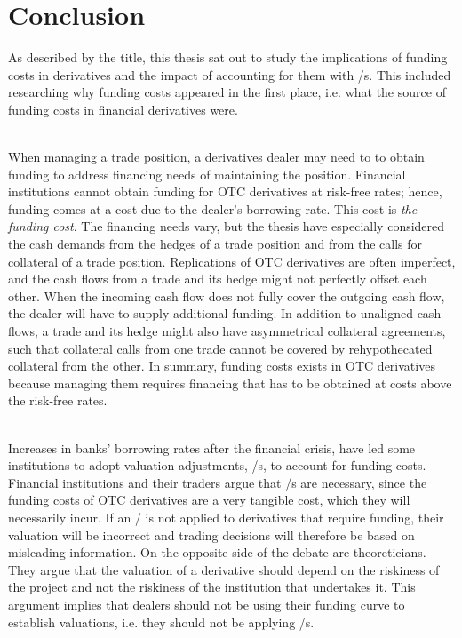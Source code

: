 \documentclass[main.tex]{subfiles}
\begin{document}
    \section{Conclusion}

    As described by the title, this thesis sat out to study the implications
    of funding costs in derivatives and the impact of accounting for them with \FVA/s.
    This included researching why funding costs appeared in the first place,
    i.e. what the source of funding costs in financial derivatives were.
    
    \textbf{\researchQuestionFundingCosts}\\
    When managing a trade position, a derivatives dealer may need to to obtain funding 
    to address financing needs of maintaining the position.
    Financial institutions cannot obtain funding for OTC derivatives at risk-free rates;
    hence, funding comes at a cost due to the dealer's borrowing rate.
    This cost is \textit{the funding cost}.
    The financing needs vary, but the thesis have especially considered
    the cash demands from the hedges of a trade position
    and from the calls for collateral of a trade position.
    Replications of OTC derivatives are often imperfect,
    and the cash flows from a trade and its hedge might not perfectly offset each other.
    When the incoming cash flow does not fully cover the outgoing cash flow,
    the dealer will have to supply additional funding.
    In addition to unaligned cash flows, 
    a trade and its hedge might also have asymmetrical collateral agreements,
    such that collateral calls from one trade cannot be covered by rehypothecated collateral from the other.
    In summary, funding costs exists in OTC derivatives
    because managing them requires financing 
    that has to be obtained at costs above the risk-free rates.

    \textbf{\researchQuestionFvaDebate}\\
    Increases in banks' borrowing rates after the financial crisis,
    have led some institutions to adopt valuation adjustments, \FVA/s, to account for funding costs.
    Financial institutions and their traders argue that \FVA/s are necessary,
    since the funding costs of OTC derivatives are a very tangible cost,
    which they will necessarily incur.
    If an \FVA/ is not applied to derivatives that require funding,
    their valuation will be incorrect and trading decisions will therefore be based on misleading information.
    On the opposite side of the debate are theoreticians.
    They argue that the valuation of a derivative should depend on the riskiness of the project
    and not the riskiness of the institution that undertakes it.
    This argument implies that dealers should not be using their funding curve to establish 
    valuations, i.e. they should not be applying \FVA/s.
\end{document}

